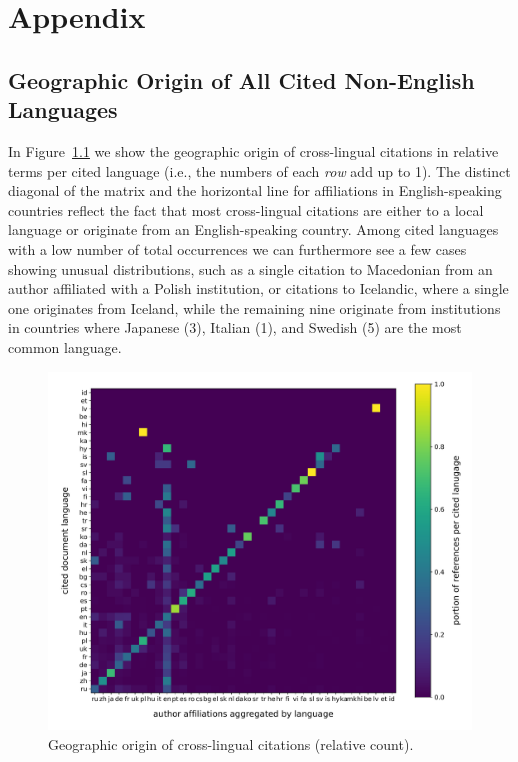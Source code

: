 \chapter{Appendix}

\section{Geographic Origin of All Cited Non-English Languages}\label{app:geo_origin}

In Figure~\ref{fig:geo_full} we show the geographic origin of cross-lingual citations in relative terms per cited language (i.e., the numbers of each \emph{row} add up to 1). The distinct diagonal of the matrix and the horizontal line for affiliations in English-speaking countries reflect the fact that most cross-lingual citations are either to a local language or originate from an English-speaking country. Among cited languages with a low number of total occurrences we can furthermore see a few cases showing unusual distributions, such as a single citation to Macedonian from an author affiliated with a Polish institution, or citations to Icelandic, where a single one originates from Iceland, while the remaining nine originate from institutions in countries where Japanese (3), Italian (1), and Swedish (5) are the most common language.

\begin{figure}[tb]
\centering
\includegraphics[width=\textwidth]{figures/ref_xling/citlang_to_author_aff_all_relative_crop.pdf}
\caption[Geographic origin of cross-lingual citations (relative count)]{Geographic origin of cross-lingual citations (relative count).} \label{fig:geo_full}
\end{figure}

